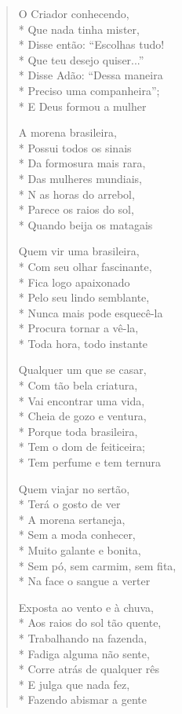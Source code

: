 \begin{verse}
O Criador conhecendo,\\*
Que nada tinha mister,\\*
Disse então: ``Escolhas tudo!\\*
Que teu desejo quiser...''\\*
Disse Adão: ``Dessa maneira\\*
Preciso uma companheira'';\\*
E Deus formou a mulher

A morena brasileira,\\*
Possui todos os sinais\\*
Da formosura mais rara,\\*
Das mulheres mundiais,\\*
N as horas do arrebol,\\*
Parece os raios do sol,\\*
Quando beija os matagais

Quem vir uma brasileira,\\*
Com seu olhar fascinante,\\*
Fica logo apaixonado\\*
Pelo seu lindo semblante,\\*
Nunca mais pode esquecê-la\\*
Procura tornar a vê-la,\\*
Toda hora, todo instante

Qualquer um que se casar,\\*
Com tão bela criatura,\\*
Vai encontrar uma vida,\\*
Cheia de gozo e ventura,\\*
Porque toda brasileira,\\*
Tem o dom de feiticeira;\\*
Tem perfume e tem ternura

Quem viajar no sertão,\\*
Terá o gosto de ver\\*
A morena sertaneja,\\*
Sem a moda conhecer,\\*
Muito galante e bonita,\\*
Sem pó, sem carmim, sem fita,\\*
Na face o sangue a verter

Exposta ao vento e à chuva,\\*
Aos raios do sol tão quente,\\*
Trabalhando na fazenda,\\*
Fadiga alguma não sente,\\*
Corre atrás de qualquer rês\\*
E julga que nada fez,\\*
Fazendo abismar a gente


\end{verse}
